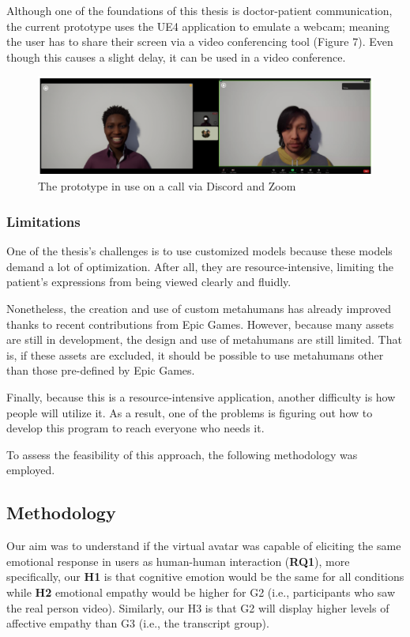 Although one of the foundations of this thesis is doctor-patient communication, the current prototype uses the UE4 application to emulate a webcam; meaning the user has to share their screen via a video conferencing tool (Figure 7). Even though this causes a slight delay, it can be used in a video conference.

\begin{figure}[h!]
\includegraphics[width=\textwidth]{figures/zoomAndDiscord.PNG}
\centering
\caption{The prototype in use on a call via Discord and Zoom}
\end{figure}

\subsubsection{Limitations}
One of the thesis's challenges is to use customized models because these models demand a lot of optimization. After all, they are resource-intensive, limiting the patient's expressions from being viewed clearly and fluidly. 

Nonetheless, the creation and use of custom metahumans has already improved thanks to recent contributions from Epic Games. However, because many assets are still in development, the design and use of metahumans are still limited. That is, if these assets are excluded, it should be possible to use metahumans other than those pre-defined by Epic Games.

Finally, because this is a resource-intensive application, another difficulty is how people will utilize it. As a result, one of the problems is figuring out how to develop this program to reach everyone who needs it.

To assess the feasibility of this approach, the following methodology was employed.

\subsection{Methodology}
Our aim was to understand if the virtual avatar was capable of eliciting the same emotional response in users as human-human interaction (\textbf{RQ1}), more specifically, our \textbf{H1} is that cognitive emotion would be the same for all conditions while \textbf{H2} emotional empathy would be higher for G2 (i.e., participants who saw the real person video). Similarly, our H3 is that G2 will display higher levels of affective empathy than G3 (i.e., the transcript group).

